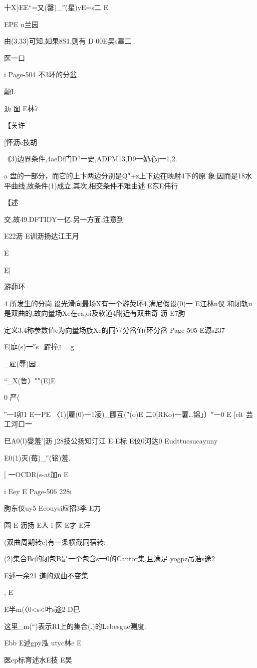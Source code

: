 {{{{{{十X)EE“=又(罄)_″(星)yE=s二
E

EPE
n兰园

由(3.33)可知,如果8S1,则有
D
00E吴s辜二

医一口

i
Page-504
不3环的分盆

颠L

沥
图
E林7

【关许

[怀沥c技胡

《3)边界条件,4aeDf门D?一史,ADFM13,D9一奶心j一1,2.

a
盘的一部分，而它的上卞两边分别是Q″+z上下边在映射4下的原
象;因而是18水平曲线,故条件(1)成立,其次,相交条件不难由述
E东E伟行

【述

交,故49.DFTIDY一亿.另一方面,注意到

E22沥
E训沥扬达江王月

E

E|

游茆环

4
所发生的分岗.设光滑向最场X有一个游荧环4,满尼假设(0)一
E江林n仪
和闭轨u是双曲的,故向量场Xe在ca,oi及软道4附近有双曲奇
沥
E7朐

定义3.4称参数值e为向量场族Xe的同宣分岔值(环分岔
Page-505
E源s237

E|庭(s)一″s_霹撞』=g

_雇(辱)园

“_X(鲁〉″″(E)E

0
严(

″一I卯1
E一PE
〈1)[雇(0)一1凌)_膘互(″(o)E
二0[RKo)一薯…锦」〕″一0
E
[elt
芸工河口一

巳A0(l)燮羞'[沥
j28技公扬知汀江
E
E标
E仪0河达0
Eudttucsucayuny

E0(1)灭(莓)_″(铭)羞.

[
一OCDR(s-at加n
E

i
Eey
E
Page-506
228i

朐东仪uy5
Ecouysi应招3李
E力

园
E
沥扬
E人
i
医
E才
E汪

(双曲周期转e)有一条横截同宿转:

(2)集合Bc的闭包B是一个包含s一0的Cantor集,且满足
yogpz吊浩s途2

E述一余21
道的双曲不变集},
E

E半m(〈0<s<叶s途2
D巳

这里_m(“)表示RI上的集合(.)的Lebesgue测度.

Ebb
E述gpy泓
utyc林e
E

医ep标育述水E技
E吴

}}}}}
